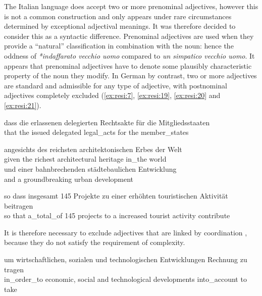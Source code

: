 \documentclass[output=paper,colorlinks,citecolor=brown]{langscibook}
\begin{document}
The Italian language does accept two or more prenominal adjectives, however this is not a common construction and only appears under rare circumstances determined by exceptional adjectival meanings. It was therefore decided to consider this as a syntactic difference. Prenominal adjectives are used when they provide a “natural” classification in combination with the noun: hence the oddness of \textit{*indaffarato vecchio uomo} compared to \textit{un simpatico vecchio uomo}. It appears that prenominal adjectives have to denote some plausibly characteristic property of the noun they modify. In German by contrast, two or more adjectives are standard and admissible for any type of adjective, with postnominal adjectives completely excluded (\ref{ex:resi:7}, \ref{ex:resi:19}, \ref{ex:resi:20} and \ref{ex:resi:21}).

\ea%
    \label{ex:resi:19}
\gll dass  die  erlassenen  delegierten  Rechtsakte  für  die  Mitgliedsstaaten \\
   that  the  issued  delegated  legal\_acts  for  the  member\_states  \\
\z



\ea%
    \label{ex:resi:20}
\gll angesichts  des  reichsten  architektonischen  Erbes  der  Welt \\
   given  the  richest  architectural  heritage  in\_the  world    \\



\gll   und  einer  bahnbrechenden  städtebaulichen  Entwicklung\\
  and  a  groundbreaking  urban  development\\
\z

\ea%
    \label{ex:resi:21}
\gll so  dass  insgesamt  145  Projekte  zu  einer  erhöhten   touristischen  Aktivität  beitragen\\
  so  that  a\_total\_of  145  projects   to  a  increased   tourist  activity  contribute\\
\z

It is therefore necessary to exclude adjectives that are linked by coordination , because they do not satisfy the requirement of complexity.

\ea%
    \label{ex:resi:22}
\gll um  wirtschaftlichen,  sozialen  und  technologischen   Entwicklungen  Rechnung  zu tragen    \\
    in\_order\_to  economic,  social  and  technological   developments  into\_account  to take    \\
\z
\end{document}
